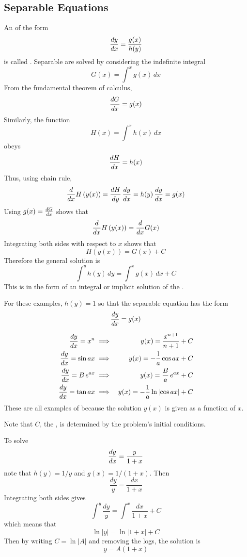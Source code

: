 \subsection{Separable Equations}
\label{ode sec:sep}

An \ODE of the form
$$\frac{dy}{dx}=\frac{g(x)}{h(y)}$$
is called .  Separable \ODEs are solved by considering the 
indefinite integral
$$G(x)=\int^x g(x)\,dx$$
From the fundamental theorem of calculus,
$$\frac{dG}{dx}=g(x)$$
Similarly, the function 
$$H(x)=\int^x h(x)\,dx$$
obeys
$$\frac{dH}{dx}=h(x)$$
Thus, using chain rule,
$$\frac{d}{d{x}}H\left(y(x)\right)=\frac{dH}{dy}\,\frac{dy}{dx}=h(y)\,\frac{dy}{dx}=g(x)$$
Using $g(x)=\frac{dG}{dx}$ shows that
$$\frac{d}{d{x}}H\left(y(x)\right)=\frac{d}{d{x}} G(x)$$
Integrating both sides with respect to $x$ shows that
$$H\left(y(x)\right)=G(x)+C$$
Therefore the general solution is
$$\int^y h(y)\,dy =\int^x g(x)\,dx +C$$
This is in the form of an integral or implicit solution of the \ODE.

\begin{example}
For these examples, $h(y)=1$ so that the separable equation has the form
$$\frac{dy}{dx}=g(x)$$

\begin{eqnarray*}
\frac{dy}{dx}=x^n		&\;\Longrightarrow\;&	y(x)=\frac{x^{n+1}}{n+1}+C	\\
\frac{dy}{dx}=\sin ax	&\;\Longrightarrow\;&	y(x)=-\frac{1}{a}\cos ax+C	\\
\frac{dy}{dx}=B\,e^{ax}	&\;\Longrightarrow\;&	y(x)=\frac{B}{a}\,e^{ax}+C	\\
\frac{dy}{dx}=\tan ax	&\;\Longrightarrow\;&	y(x)=-\frac{1}{a}\ln\left|\cos ax\right|+C
\end{eqnarray*}
These are all examples of  because the solution
$y(x)$ is given as a function of $x$.
\end{example}

Note that $C$, the , is determined by the
problem's initial conditions.

\begin{example}
To solve
$$\frac{dy}{dx}=\frac{y}{1+x}$$
note that $h(y)=1/y$ and $g(x)=1/(1+x)$.  Then
$$\frac{dy}{y}=\frac{dx}{1+x}$$
Integrating both sides gives
$$\int^y \frac{dy}{y}=\int^x\frac{dx}{1+x}+C$$
which means that
$$\ln\left|y\right|=\ln\left|1+x\right|+C$$
Then by writing $C=\ln\left|A\right|$ and removing the logs, the solution is
$$y=A(1+x)$$
\end{example}

